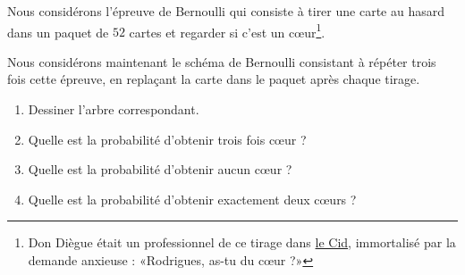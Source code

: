 
\begin{exercice}\label{exoPremiere-0074}

    Nous considérons l'épreuve de Bernoulli qui consiste à tirer une carte au hasard dans un paquet de \( 52\) cartes et regarder si c'est un cœur\footnote{Don Diègue était un professionnel de ce tirage dans \href{http://fr.wikisource.org/wiki/Le_Cid}{le Cid}, immortalisé par la demande anxieuse : «Rodrigues, as-tu du cœur ?»}.

    Nous considérons maintenant le schéma de Bernoulli consistant à répéter trois fois cette épreuve, en replaçant la carte dans le paquet après chaque tirage.
    \begin{enumerate}
        \item
            Dessiner l'arbre correspondant.
\item
    Quelle est la probabilité d'obtenir trois fois cœur ?
\item
    Quelle est la probabilité d'obtenir aucun cœur ?
\item
    Quelle est la probabilité d'obtenir exactement deux cœurs ?
            
    \end{enumerate}

\end{exercice}
